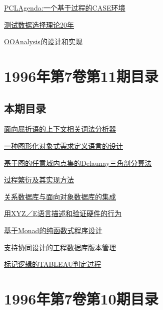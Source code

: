 \documentclass[a4paper]{article}
\begin{document}
\href{http://www.jos.org.cn/ch/reader/download_pdf.aspx?file_no=19961205&year_id=1996&quarter_id=12&falg=1}{PCLAgenda:一个基于过程的CASE环境}

\href{http://www.jos.org.cn/ch/reader/download_pdf.aspx?file_no=19961206&year_id=1996&quarter_id=12&falg=1}{测试数据选择理论20年}

\href{http://www.jos.org.cn/ch/reader/download_pdf.aspx?file_no=19961207&year_id=1996&quarter_id=12&falg=1}{OOAnalysis的设计和实现}


\section{\textbf{1996年第7卷第11期目录}}
\subsection{本期目录}
\href{http://www.jos.org.cn/ch/reader/download_pdf.aspx?file_no=19961101&year_id=1996&quarter_id=11&falg=1}{面向屈折语的上下文相关词法分析器}

\href{http://www.jos.org.cn/ch/reader/download_pdf.aspx?file_no=19961102&year_id=1996&quarter_id=11&falg=1}{一种图形化对象式需求定义语言的设计}

\href{http://www.jos.org.cn/ch/reader/download_pdf.aspx?file_no=19961103&year_id=1996&quarter_id=11&falg=1}{基于图的任意域内点集的Delaunay三角剖分算法}

\href{http://www.jos.org.cn/ch/reader/download_pdf.aspx?file_no=19961104&year_id=1996&quarter_id=11&falg=1}{过程繁衍及其实现方法}

\href{http://www.jos.org.cn/ch/reader/download_pdf.aspx?file_no=19961105&year_id=1996&quarter_id=11&falg=1}{关系数据库与面向对象数据库的集成}

\href{http://www.jos.org.cn/ch/reader/download_pdf.aspx?file_no=19961106&year_id=1996&quarter_id=11&falg=1}{用XYZ／E语言描述和验证硬件的行为}

\href{http://www.jos.org.cn/ch/reader/download_pdf.aspx?file_no=19961107&year_id=1996&quarter_id=11&falg=1}{基于Monad的纯函数式程序设计}

\href{http://www.jos.org.cn/ch/reader/download_pdf.aspx?file_no=19961108&year_id=1996&quarter_id=11&falg=1}{支持协同设计的工程数据库版本管理}

\href{http://www.jos.org.cn/ch/reader/download_pdf.aspx?file_no=19961109&year_id=1996&quarter_id=11&falg=1}{标记逻辑的TABLEAU判定过程}


\section{\textbf{1996年第7卷第10期目录}}
\end{document}
